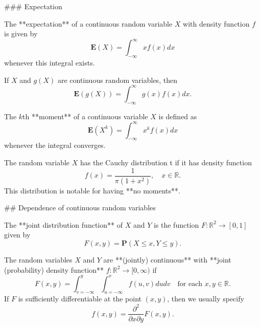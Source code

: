 ### Expectation
\begin{definition}
The **expectation** of a continuous random variable $X$ with density function $f$ is given by 
\begin{equation*}
    \mathbf{E}(X) = \int_{-\infty}^\infty xf(x) dx
\end{equation*}
whenever this integral exists.
\end{definition}

\begin{theorem}
If $X$ and $g(X)$ are continuous random variables, then \begin{equation*}
    \mathbf{E}\left( g(X) \right) = \int_{-\infty}^\infty g(x)f(x) dx.
\end{equation*}
\end{theorem}

\begin{definition}
The $k$th **moment** of a continuous variable $X$ is defined as
\begin{equation*}
    \mathbf{E}(X^k) = \int_{-\infty}^\infty x^k f(x) dx
\end{equation*}
whenever the integral converges.
\end{definition}

\begin{example} The random variable $X$ has the Cauchy distribution t if it has density 
function 
\begin{equation*}
    f(x) = \frac{1}{\pi (1+x^2)}, \quad x \in \mathbb{R}.
\end{equation*}
This distribution is notable for having **no moments**.
\end{example}

## Dependence of continuous random variables
\begin{definition}
The **joint distribution function** of $X$ and $Y$ is the function $F: \mathbb{R}^2 \to [0, 1]$ given by 
\begin{equation*}
    F(x,y) = \mathbf{P}(X\leq x, Y \leq y).
\end{equation*}
\end{definition}

\begin{definition}
The random variables $X$ and $Y$ are **(jointly) continuous** with **joint (probability) density function** $f : \mathbb{R}^2 \to [0, \infty)$ if
\begin{equation*}
    F(x, y)=\int_{v=-\infty}^{y} \int_{u=-\infty}^{x} f(u, v) d u d v \quad \text{for each } x, y\in\mathbb{R}. 
\end{equation*}
If $F$ is sufficiently differentiable at the point $(x , y)$, then we usually specify 
\begin{equation*}
    f(x, y)=\frac{\partial^{2}}{\partial x \partial y} F(x, y).
\end{equation*}
\end{definition}

